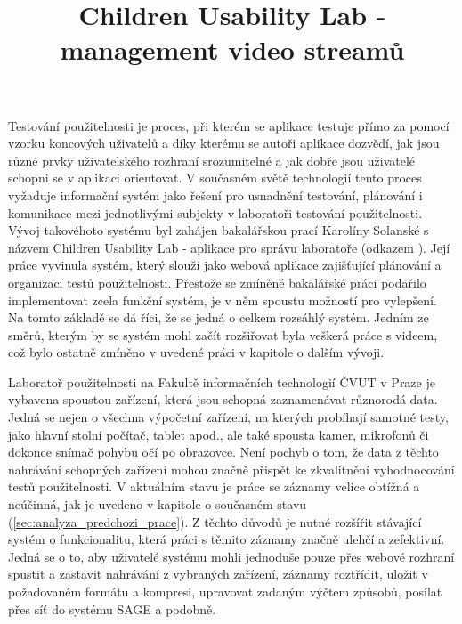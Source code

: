 \documentclass[thesis=M,czech]{FITthesis}[2012/06/26]
\title{Children Usability Lab - management video streamů}
\begin{document}

\begin{introduction}
Testování použitelnosti je proces, při kterém se aplikace testuje přímo za pomocí vzorku koncových uživatelů a díky kterému 
se autoři aplikace dozvědí, jak jsou různé prvky uživatelského rozhraní srozumitelné a jak dobře jsou uživatelé schopni se v aplikaci orientovat. V současném světě technologií tento proces vyžaduje informační systém jako řešení pro usnadnění testování, plánování i komunikace mezi jednotlivými subjekty v laboratoři testování použitelnosti. Vývoj takovéhoto systému byl zahájen bakalářskou prací Karolíny Solanské s názvem Children Usability Lab - aplikace pro správu laboratoře (odkazem \cite{solankar}). Její práce vyvinula systém, který slouží jako webová aplikace zajišťující plánování a organizaci testů použitelnosti. Přestože se zmíněné bakalářské práci podařilo implementovat zcela funkční systém, je v něm spoustu možností pro vylepšení. Na tomto základě se dá říci, že se jedná o celkem rozsáhlý systém. Jedním ze směrů, kterým by se systém mohl začít rozšiřovat byla veškerá práce s videem, což bylo ostatně zmíněno v uvedené práci v kapitole o dalším vývoji.

Laboratoř použitelnosti na Fakultě informačních technologií ČVUT v Praze je vybavena spoustou zařízení, která jsou schopná zaznamenávat různorodá data. Jedná se nejen o všechna výpočetní zařízení, na kterých probíhají samotné testy, jako hlavní stolní počítač, tablet apod., ale také spousta kamer, mikrofonů či dokonce snímač pohybu očí po obrazovce. Není pochyb o tom, že data z těchto nahrávání schopných zařízení mohou značně přispět ke zkvalitnění vyhodnocování testů použitelnosti. V aktuálním stavu je práce se záznamy velice obtížná a neúčinná, jak je uvedeno v kapitole o současném stavu (\ref{sec:analyza_predchozi_prace}). Z těchto důvodů je nutné rozšířit stávající systém o funkcionalitu, která práci s těmito záznamy značně ulehčí a zefektivní. Jedná se o to, aby uživatelé systému mohli jednoduše pouze přes webové rozhraní spustit a zastavit nahrávání z vybraných zařízení, záznamy roztřídit, uložit v požadovaném formátu a kompresi, upravovat zadaným výčtem způsobů, posílat přes síť do systému SAGE a podobně.
\end{introduction}
\end{document}
